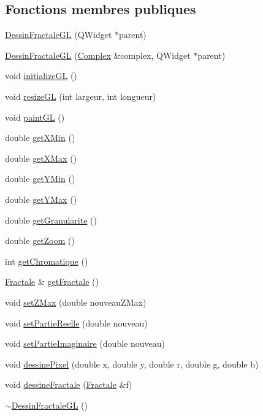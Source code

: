 \subsection*{Fonctions membres publiques}
\begin{DoxyCompactItemize}
\item 
\hyperlink{classDessinFractaleGL_a20c8b74a98b58180ab241e41fdaa3649}{Dessin\+Fractale\+GL} (Q\+Widget $\ast$parent)
\item 
\hyperlink{classDessinFractaleGL_a5a2c37ded5cee601b0b3fec8a1076ee4}{Dessin\+Fractale\+GL} (\hyperlink{classComplex}{Complex} \&complex, Q\+Widget $\ast$parent)
\item 
void \hyperlink{classDessinFractaleGL_a9ad221cef5dcba79ba0a3105da2c81fd}{initialize\+GL} ()
\item 
void \hyperlink{classDessinFractaleGL_a710489754151a61fce818fab53850f3b}{resize\+GL} (int largeur, int longueur)
\item 
void \hyperlink{classDessinFractaleGL_a75f2da3d7df21b06d387f92752cb7c29}{paint\+GL} ()
\item 
double \hyperlink{classDessinFractaleGL_ad9f3cfb6509fefc10cd2da6082282fe9}{get\+X\+Min} ()
\item 
double \hyperlink{classDessinFractaleGL_a36c057c16f024e4f1cac1500a7c4ae2a}{get\+X\+Max} ()
\item 
double \hyperlink{classDessinFractaleGL_a78ee41ef94d377affbbacf4c63b47c85}{get\+Y\+Min} ()
\item 
double \hyperlink{classDessinFractaleGL_ade4c6d35f4b7b50b0f3fba0234170e17}{get\+Y\+Max} ()
\item 
double \hyperlink{classDessinFractaleGL_ab947d47dccd774fd47e07d221d8fe298}{get\+Granularite} ()
\item 
double \hyperlink{classDessinFractaleGL_a65f03f1d92902cf57e088a99f573a93d}{get\+Zoom} ()
\item 
int \hyperlink{classDessinFractaleGL_a942a7d978d67fa83885c3b92929e4a7e}{get\+Chromatique} ()
\item 
\hyperlink{classFractale}{Fractale} \& \hyperlink{classDessinFractaleGL_a79ab8ed94185b26717dbc73fd428dfce}{get\+Fractale} ()
\item 
void \hyperlink{classDessinFractaleGL_a6b797eb0823a66b19cdf9d62bad58a3d}{set\+Z\+Max} (double nouveau\+Z\+Max)
\item 
void \hyperlink{classDessinFractaleGL_a0e06c9c77de183536183c4794713b0ea}{set\+Partie\+Reelle} (double nouveau)
\item 
void \hyperlink{classDessinFractaleGL_aa8c8e1c831c90d0f669963d18de384fa}{set\+Partie\+Imaginaire} (double nouveau)
\item 
void \hyperlink{classDessinFractaleGL_a3f2cb057946af75ae1bb887e984c5a02}{dessine\+Pixel} (double x, double y, double r, double g, double b)
\item 
void \hyperlink{classDessinFractaleGL_afe2be363c25420aec109c83890dade6e}{dessine\+Fractale} (\hyperlink{classFractale}{Fractale} \&f)
\item 
\hyperlink{classDessinFractaleGL_a9b65d2d37f9b8c615713b9d0cd1b15d3}{$\sim$\+Dessin\+Fractale\+GL} ()
\end{DoxyCompactItemize}
